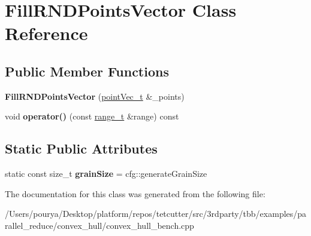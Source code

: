 \hypertarget{classFillRNDPointsVector}{}\section{Fill\+R\+N\+D\+Points\+Vector Class Reference}
\label{classFillRNDPointsVector}
\subsection*{Public Member Functions}
\begin{DoxyCompactItemize}
\item 
\hypertarget{classFillRNDPointsVector_a35d6162ca7c89ec3bdec23e2839e42bd}{}{\bfseries Fill\+R\+N\+D\+Points\+Vector} (\hyperlink{classtbb_1_1concurrent__vector}{point\+Vec\+\_\+t} \&\+\_\+points)\label{classFillRNDPointsVector_a35d6162ca7c89ec3bdec23e2839e42bd}

\item 
\hypertarget{classFillRNDPointsVector_a7e9d9f7af87462700a66647dc6cc35a5}{}void {\bfseries operator()} (const \hyperlink{classtbb_1_1blocked__range}{range\+\_\+t} \&range) const \label{classFillRNDPointsVector_a7e9d9f7af87462700a66647dc6cc35a5}

\end{DoxyCompactItemize}
\subsection*{Static Public Attributes}
\begin{DoxyCompactItemize}
\item 
\hypertarget{classFillRNDPointsVector_adff5ec600fa99fff9598a9ce0a3cfb3e}{}static const size\+\_\+t {\bfseries grain\+Size} = cfg\+::generate\+Grain\+Size\label{classFillRNDPointsVector_adff5ec600fa99fff9598a9ce0a3cfb3e}

\end{DoxyCompactItemize}


The documentation for this class was generated from the following file\+:\begin{DoxyCompactItemize}
\item 
/\+Users/pourya/\+Desktop/platform/repos/tetcutter/src/3rdparty/tbb/examples/parallel\+\_\+reduce/convex\+\_\+hull/convex\+\_\+hull\+\_\+bench.\+cpp\end{DoxyCompactItemize}
